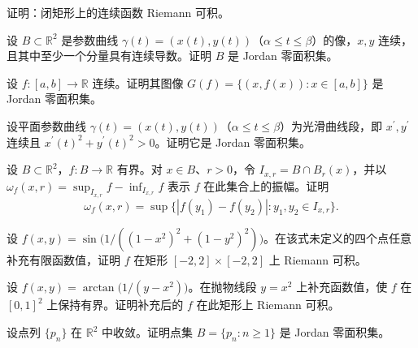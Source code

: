 \newpage
\noindent\begin{minipage}{\textwidth}
证明：闭矩形上的连续函数 Riemann 可积。
\end{minipage}\par\vfill
\noindent\begin{minipage}{\textwidth}
设 $B\subset\mathbb R^2$ 是参数曲线 $\gamma(t)=(x(t),y(t))$（$\alpha\le t\le\beta$）的像，$x,y$ 连续，且其中至少一个分量具有连续导数。证明 $B$ 是 Jordan 零面积集。
\end{minipage}\par\vfill
\noindent\begin{minipage}{\textwidth}
设 $f:[a,b]\to\mathbb R$ 连续。证明其图像 $G(f)=\{(x,f(x)):x\in[a,b]\}$ 是 Jordan 零面积集。
\end{minipage}\par\vfill
\newpage
\noindent\begin{minipage}{\textwidth}
设平面参数曲线 $\gamma(t)=(x(t),y(t))$（$\alpha\le t\le\beta$）为光滑曲线段，即 $x^{\prime},y^{\prime}$ 连续且 $x^{\prime}(t)^2+y^{\prime}(t)^2>0$。证明它是 Jordan 零面积集。
\end{minipage}\par\vfill
\noindent\begin{minipage}{\textwidth}
设 $B\subset\mathbb R^2$，$f:B\to\mathbb R$ 有界。对 $x\in B$、$r>0$，令 $I_{x,r}=B\cap B_r(x)$，并以 $\omega_f(x,r)=\sup_{I_{x,r}}f-\inf_{I_{x,r}}f$ 表示 $f$ 在此集合上的振幅。证明\[\omega_f(x,r)=\sup\{|f(y_1)-f(y_2)|:y_1,y_2\in I_{x,r}\}.\]
\end{minipage}\par\vfill
\noindent\begin{minipage}{\textwidth}
设 $f(x,y)=\sin\!\bigl(1/((1-x^2)^2+(1-y^2)^2)\bigr)$。在该式未定义的四个点任意补充有限函数值，证明 $f$ 在矩形 $[-2,2]\times[-2,2]$ 上 Riemann 可积。
\end{minipage}\par\vfill
\newpage
\noindent\begin{minipage}{\textwidth}
设 $f(x,y)=\arctan\!\bigl(1/(y-x^2)\bigr)$。在抛物线段 $y=x^2$ 上补充函数值，使 $f$ 在 $[0,1]^2$ 上保持有界。证明补充后的 $f$ 在此矩形上 Riemann 可积。
\end{minipage}\par\vfill
\noindent\begin{minipage}{\textwidth}
设点列 $\{p_n\}$ 在 $\mathbb R^2$ 中收敛。证明点集 $B=\{p_n:n\ge1\}$ 是 Jordan 零面积集。
\end{minipage}\par\vfill
